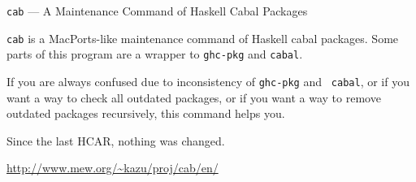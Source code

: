 \begin{hcarentry}{{\tt cab} --- A Maintenance Command of Haskell Cabal Packages}
\makeheader

{\tt cab} is a MacPorts-like maintenance command of Haskell cabal packages.
Some parts of this program are a wrapper to {\tt ghc-pkg} and {\tt cabal}.

If you are always confused due to inconsistency of {\tt ghc-pkg} and {\tt
cabal}, or if you want a way to check all outdated packages, or if you want a
way to remove outdated packages recursively, this command helps you.

Since the last HCAR, nothing was changed.

\FurtherReading
  \url{http://www.mew.org/~kazu/proj/cab/en/}
\end{hcarentry}
